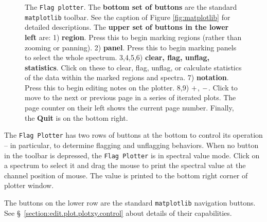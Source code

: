\begin{figure}[h!]
\begin{center}
\caption{\label{fig:flagplotter} 
  The {\tt Flag plotter}.
  The {\bf bottom set of buttons} are the standard {\tt matplotlib} toolbar. 
  See the caption of Figure \ref{fig:matplotlib} for detailed descriptions.
  The {\bf upper set of buttons in the lower left} are:
  1) {\bf region}. Press this to begin marking regions (rather than
  zooming or panning).  
  2) {\bf panel}. Press this to begin marking panels to select the whole 
  spectrum.
  3,4,5,6) {\bf clear, flag, unflag, statistics}.  Click on these to clear, 
  flag, unflag, or calculate statistics of the data within the marked 
  regions and spectra.  
  7) {\bf notation}. Press this to begin editing notes on the plotter. 
  8,9) $ {\bf +} $, $ {\bf -} $. Click to move to the next or previous page in a series 
  of iterated plots. The page counter on their left shows the current page 
  number. Finally, the {\bf Quit} is on the bottom right.}
\hrulefill
\end{center}
\end{figure}

The {\tt Flag Plotter} has two rows of buttons at the bottom to 
control its operation -- in particular, to determine flagging and 
unflagging behaviors. 
When no button in the toolbar is depressed, 
the {\tt Flag Plotter} is in spectral value mode. 
Click on a spectrum to select it and drag the mouse to print 
the spectral value at the channel position of mouse. The value is printed 
to the bottom right corner of plotter window.

The buttons on the lower row are the standard 
{\tt matplotlib} navigation buttons. 
See \S~\ref{section:edit.plot.plotxy.control} about details of their 
capabilities.

